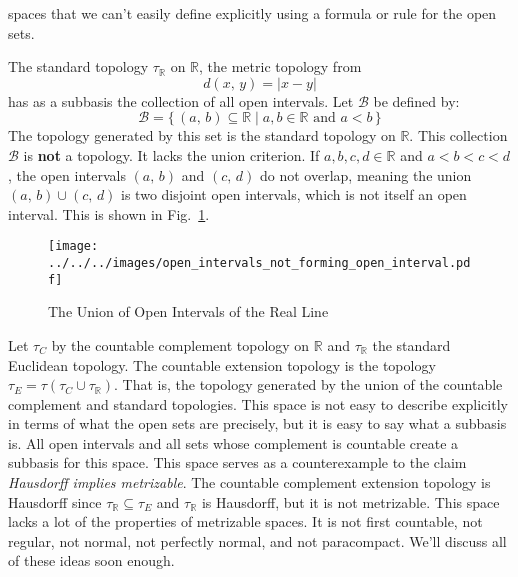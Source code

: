 \documentclass{article}
\theoremstyle{plain}
\theoremstyle{normal}
\newenvironment{example}{%
    \pushQED{\qed}\renewcommand{\qedsymbol}{$\blacksquare$}\examplex%
}{%
    \popQED\endexamplex%
}
\begin{document}
        spaces that we can't easily define explicitly using a formula or rule
        for the open sets.
        \begin{example}
            The standard topology $\tau_{\mathbb{R}}$ on $\mathbb{R}$, the
            metric topology from
            \begin{equation}
                d(x,\,y)=|x-y|
            \end{equation}
            has as a subbasis the
            collection of all open intervals. Let $\mathcal{B}$ be
            defined by:
            \begin{equation}
                \mathcal{B}=\{\,(a,\,b)\subseteq\mathbb{R}\;|\;a,b\in\mathbb{R}
                    \textrm{ and }a<b\,\}
            \end{equation}
            The topology generated by this set is the standard topology on
            $\mathbb{R}$. This collection $\mathcal{B}$ is \textbf{not} a
            topology. It lacks the union criterion. If $a,b,c,d\in\mathbb{R}$
            and $a<b<c<d$, the open intervals
            $(a,\,b)$ and $(c,\,d)$ do not overlap, meaning the union
            $(a,\,b)\cup(c,\,d)$ is two disjoint open intervals, which is not
            itself an open interval. This is shown in
            Fig.~\ref{fig:open_intervals_not_forming_open_interval}.
        \end{example}
        \begin{figure}
            \centering
            \texttt{[image: ../../../images/open\_intervals\_not\_forming\_open\_interval.pdf]}
            \caption{The Union of Open Intervals of the Real Line}
            \label{fig:open_intervals_not_forming_open_interval}
        \end{figure}
        \begin{example}[\textbf{The Countable Extension Topology}]
            Let $\tau_{C}$ by the countable complement topology on
            $\mathbb{R}$ and $\tau_{\mathbb{R}}$ the standard Euclidean
            topology. The countable extension topology is the topology
            $\tau_{E}=\tau(\tau_{C}\cup\tau_{\mathbb{R}})$. That is, the
            topology generated by the union of the countable complement and
            standard topologies. This space is not easy to describe explicitly
            in terms of what the open sets are precisely, but it is easy to
            say what a subbasis is. All open intervals and all sets whose
            complement is countable create a subbasis for this space. This space
            serves as a counterexample to the claim
            \textit{Hausdorff implies metrizable}. The countable complement
            extension topology is Hausdorff since
            $\tau_{\mathbb{R}}\subseteq\tau_{E}$ and $\tau_{\mathbb{R}}$ is
            Hausdorff, but it is not metrizable. This space lacks a lot of the
            properties of metrizable spaces.
            It is not first countable, not regular, not normal, not
            perfectly normal, and not paracompact. We'll discuss all of these
            ideas soon enough.
        \end{example}
\end{document}
